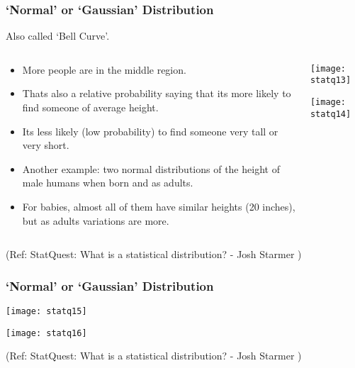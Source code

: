 \begin{frame}[fragile]\frametitle{`Normal' or `Gaussian' Distribution}
Also called `Bell Curve'.

\begin{columns}
    \begin{column}[T]{0.6\linewidth}
	\begin{itemize}
	\item More people are in the middle region. 
	\item Thats also a relative probability saying that its more likely to find someone of average height.
	\item Its less likely (low probability) to find someone very tall or very short.
	\item Another example: two normal distributions of the height of male humans when born and as adults.
	\item For babies, almost all of them have similar heights (20 inches), but as adults variations are more.
	\end{itemize}

    \end{column}
    \begin{column}[T]{0.4\linewidth}
      \begin{center}
      \texttt{[image: statq13]}
	  
	  \texttt{[image: statq14]}
	   
	  	\end{center}
    \end{column}

  \end{columns}
  
\tiny{(Ref: StatQuest: What is a statistical distribution? - Josh Starmer )}
\end{frame}


\begin{frame}[fragile]\frametitle{`Normal' or `Gaussian' Distribution}
      \begin{center}
      \texttt{[image: statq15]}
	  
	  \texttt{[image: statq16]}
    \end{center}
		

\tiny{(Ref: StatQuest: What is a statistical distribution? - Josh Starmer )}
\end{frame}

